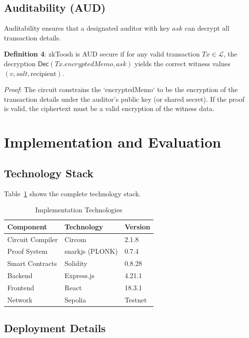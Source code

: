 \documentclass[conference]{IEEEtran}
\begin{document}
\subsection{Auditability (AUD)}

Auditability ensures that a designated auditor with key $ask$ can decrypt all transaction details.

\textbf{Definition 4}: zkToosh is AUD secure if for any valid transaction $Tx \in \mathcal{L}$, the decryption $\mathsf{Dec}(Tx.encryptedMemo, ask)$ yields the correct witness values $(v, salt, \text{recipient})$.

\textit{Proof}: The circuit constrains the `encryptedMemo` to be the encryption of the transaction details under the auditor's public key (or shared secret). If the proof is valid, the ciphertext must be a valid encryption of the witness data.

% 
% 
\section{Implementation and Evaluation}
\label{sec:implementation}

\subsection{Technology Stack}

Table~\ref{tab:tech} shows the complete technology stack.

\begin{table}[h]
\caption{Implementation Technologies}
\label{tab:tech}
\centering
\small
\begin{tabular}{lll}
\toprule
\textbf{Component} & \textbf{Technology} & \textbf{Version} \\
\midrule
Circuit Compiler & Circom & 2.1.8 \\
Proof System & snarkjs (PLONK) & 0.7.4 \\
Smart Contracts & Solidity & 0.8.28 \\
Backend & Express.js & 4.21.1 \\
Frontend & React & 18.3.1 \\
Network & Sepolia & Testnet \\
\bottomrule
\end{tabular}
\end{table}

\subsection{Deployment Details}
\end{document}
